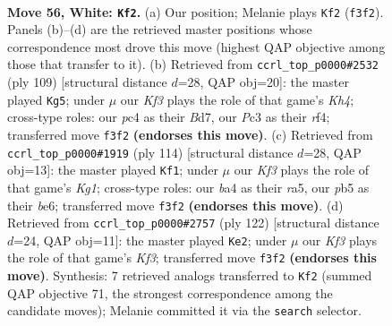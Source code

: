 \documentclass[11pt]{article}
\begin{document}
\clearpage

\begin{figure}[p]\centering
\begin{subfigure}{0.46\textwidth}\centering
\resizebox{\linewidth}{!}{%
\newchessgame
\chessboard[
  setfen={6k1/8/1R6/pp4r1/b1p5/P1P2K2/1B6/8 w - - 18 56},
  showmover=false,
  pgfstyle=straightmove, color=movearrow, markmove={f3-f2}
]}
\caption{}
\end{subfigure}\hfill
\begin{subfigure}{0.46\textwidth}\centering
\resizebox{\linewidth}{!}{%
\newchessgame
\chessboard[
  setfen={8/3b4/3r4/1p1P3k/5R2/1B3P1p/P6K/8 b - - 3 55},
  showmover=false,
  pgfstyle=straightmove, color=movearrow, markmove={h5-g5}
]}
\caption{}
\end{subfigure}
\\[4pt]
\begin{subfigure}{0.46\textwidth}\centering
\resizebox{\linewidth}{!}{%
\newchessgame
\chessboard[
  setfen={8/5p2/4b3/r6p/5BpP/3k2P1/8/4R1K1 w - - 20 58},
  showmover=false,
  pgfstyle=straightmove, color=movearrow, markmove={g1-f1}
]}
\caption{}
\end{subfigure}\hfill
\begin{subfigure}{0.46\textwidth}\centering
\resizebox{\linewidth}{!}{%
\newchessgame
\chessboard[
  setfen={2r2k2/6p1/4R2p/p6P/6P1/1B3K2/3b4/8 w - - 11 62},
  showmover=false,
  pgfstyle=straightmove, color=movearrow, markmove={f3-e2}
]}
\caption{}
\end{subfigure}
\caption{\textbf{Move 56, White: \texttt{Kf2}.} (a) Our position; Melanie plays \texttt{Kf2} (\texttt{f3f2}). Panels (b)--(d) are the retrieved master positions whose correspondence most drove this move (highest QAP objective among those that transfer to it). (b) Retrieved from \texttt{ccrl\_top\_p0000\#2532} (ply 109) [structural distance $d$=28, QAP obj=20]: the master played \texttt{Kg5}; under $\mu$ our \emph{Kf3} plays the role of that game's \emph{Kh4}; cross-type roles: our \emph{p}c4 as their \emph{B}d7, our \emph{P}c3 as their \emph{r}f4; transferred move \texttt{f3f2} \textbf{(endorses this move)}. (c) Retrieved from \texttt{ccrl\_top\_p0000\#1919} (ply 114) [structural distance $d$=28, QAP obj=13]: the master played \texttt{Kf1}; under $\mu$ our \emph{Kf3} plays the role of that game's \emph{Kg1}; cross-type roles: our \emph{b}a4 as their \emph{r}a5, our \emph{p}b5 as their \emph{b}e6; transferred move \texttt{f3f2} \textbf{(endorses this move)}. (d) Retrieved from \texttt{ccrl\_top\_p0000\#2757} (ply 122) [structural distance $d$=24, QAP obj=11]: the master played \texttt{Ke2}; under $\mu$ our \emph{Kf3} plays the role of that game's \emph{Kf3}; transferred move \texttt{f3f2} \textbf{(endorses this move)}. Synthesis: 7 retrieved analogs transferred to \texttt{Kf2} (summed QAP objective 71, the strongest correspondence among the candidate moves); Melanie committed it via the \texttt{search} selector.}
\label{fig:thought-m110}
\end{figure}
\end{document}
